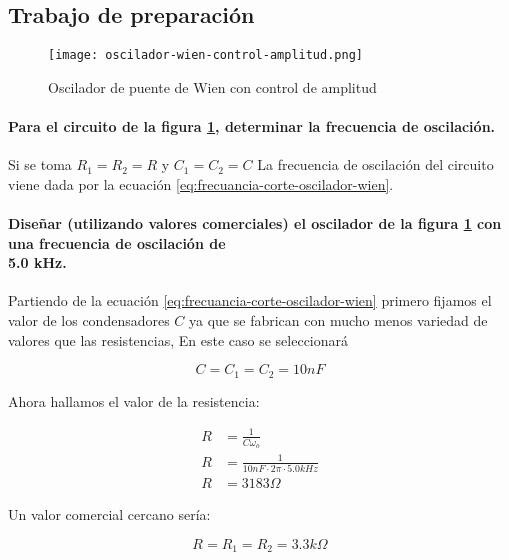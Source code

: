 \subsection{Trabajo de preparación}

\begin{figure}[ht]
    \centering
    \texttt{[image: oscilador-wien-control-amplitud.png]}
    \caption{Oscilador de puente de Wien con control de amplitud}
    \label{fig:oscilador-puente-wien-control-de-amplitud}
\end{figure}

\paragraph{Para el circuito de la figura \ref{fig:oscilador-puente-wien-control-de-amplitud}, determinar la frecuencia de oscilación.\\}

Si se toma $R_1 = R_2 = R$ y $C_1 = C_2 = C$ La frecuencia de oscilación del circuito viene dada por la ecuación \ref{eq:frecuancia-corte-oscilador-wien}.

\paragraph{Diseñar (utilizando valores comerciales) el oscilador de la figura \ref{fig:oscilador-puente-wien-control-de-amplitud} con una frecuencia de oscilación de \\5.0 kHz.\\}

Partiendo de la ecuación \ref{eq:frecuancia-corte-oscilador-wien} primero fijamos el valor de los condensadores $C$ ya que se fabrican con mucho menos variedad de valores que las resistencias, En este caso se seleccionará

\begin{equation}
    \boxed{C = C_1 = C_2 = 10nF}
\end{equation}

Ahora hallamos el valor de la resistencia:

\begin{align}
    R &= \frac{1}{C \omega_o} \\
    R &= \frac{1}{10 nF \cdot 2\pi \cdot 5.0 kHz} \\
    R &= 3183\Omega
\end{align}

Un valor comercial cercano sería:

\begin{equation}
    \boxed{R = R_1 = R_2 = 3.3k\Omega}
\end{equation}

